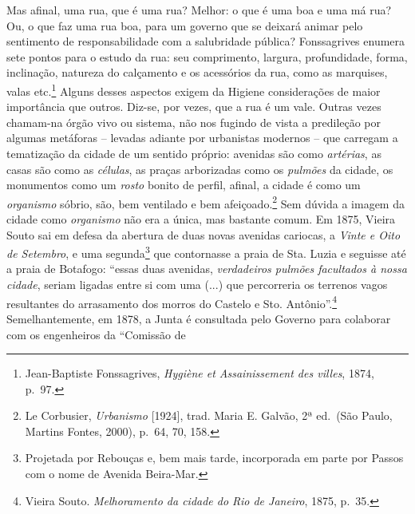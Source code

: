 Mas afinal, uma rua, que é uma rua? Melhor: o que é uma boa e uma má
rua? Ou, o que faz uma rua boa, para um governo que se deixará animar
pelo sentimento de responsabilidade com a salubridade pública?
Fonssagrives enumera sete pontos para o estudo da rua: seu comprimento,
largura, profundidade, forma, inclinação, natureza do calçamento e os
acessórios da rua, como as marquises, valas etc.\footnote{Jean-Baptiste
  Fonssagrives, \emph{Hygiène et Assainissement des villes}, 1874,
  p.~97.} Alguns desses aspectos exigem da Higiene considerações de
maior importância que outros. Diz-se, por vezes, que a rua é um vale.
Outras vezes chamam-na órgão vivo ou sistema, não nos fugindo de vista a
predileção por algumas metáforas -- levadas adiante por urbanistas
modernos -- que carregam a tematização da cidade de um sentido próprio:
avenidas são como \emph{artérias}, as casas são como as \emph{células},
as praças arborizadas como os \emph{pulmões} da cidade, os monumentos
como um \emph{rosto} bonito de perfil, afinal, a cidade é como um
\emph{organismo} sóbrio, são, bem ventilado e bem afeiçoado.\footnote{Le
  Corbusier, \emph{Urbanismo} {[}1924{]}, trad. Maria E. Galvão, 2ª
  ed.~(São Paulo, Martins Fontes, 2000), p.~64, 70, 158.} Sem dúvida a
imagem da cidade como \emph{organismo} não era a única, mas bastante
comum. Em 1875, Vieira Souto sai em defesa da abertura de duas novas
avenidas cariocas, a \emph{Vinte e Oito de Setembro}, e uma
segunda\footnote{Projetada por Rebouças e, bem mais tarde, incorporada
  em parte por Passos com o nome de Avenida Beira-Mar.} que contornasse
a praia de Sta. Luzia e seguisse até a praia de Botafogo: ``essas duas
avenidas, \emph{verdadeiros pulmões facultados à nossa cidade}, seriam
ligadas entre si com uma (...) que percorreria os terrenos vagos
resultantes do arrasamento dos morros do Castelo e Sto.
Antônio''.\footnote{Vieira Souto. \emph{Melhoramento da cidade do Rio de
  Janeiro}, 1875, p.~35.} Semelhantemente, em 1878, a Junta é consultada
pelo Governo para colaborar com os engenheiros da ``Comissão de
